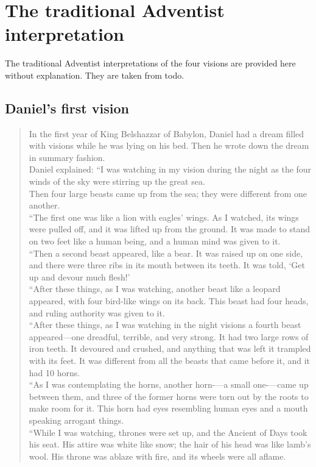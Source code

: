 \section{The traditional Adventist interpretation}
The traditional Adventist interpretations of the four visions are provided here without explanation.
They are taken from todo.

\subsection{Daniel's first vision}

\begin{verse}
     In the first year of King Belshazzar of Babylon, Daniel had a dream filled with visions while he was lying on his bed. Then he wrote down the dream in summary fashion.\\
     Daniel explained: ``I was watching in my vision during the night as the four winds of the sky were stirring up the great sea.\\
     Then four large beasts came up from the sea; they were different from one another.\\
     ``The first one was like a lion with eagles’ wings. As I watched, its wings were pulled off, and it was lifted up from the ground. It was made to stand on two feet like a human being, and a human mind was given to it. \\
     ``Then a second beast appeared, like a bear. It was raised up on one side, and there were three ribs in its mouth between its teeth. It was told, `Get up and devour much flesh!’ \\
     ``After these things, as I was watching, another beast like a leopard appeared, with four bird-like wings on its back. This beast had four heads, and ruling authority was given to it. \\
     ``After these things, as I was watching in the night visions a fourth beast appeared—one dreadful, terrible, and very strong. It had two large rows of iron teeth. It devoured and crushed, and anything that was left it trampled with its feet. It was different from all the beasts that came before it, and it had 10 horns. \\
     ``As I was contemplating the horns, another horn-—a small one-—came up between them, and three of the former horns were torn out by the roots to make room for it. This horn had eyes resembling human eyes and a mouth speaking arrogant things. \\
     ``While I was watching, thrones were set up, and the Ancient of Days took his seat. His attire was white like snow; the hair of his head was like lamb’s wool. His throne was ablaze with fire, and its wheels were all aflame. \\

\end{verse}
